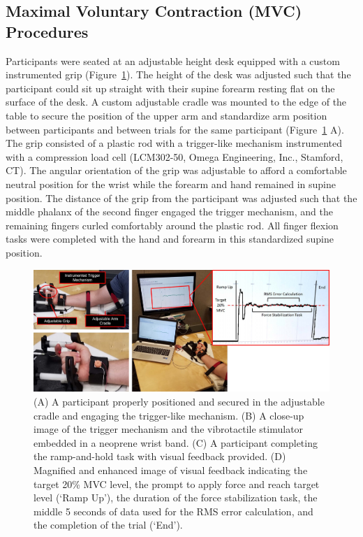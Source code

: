 \documentclass[]{cik}%
\begin{document}
\hypertarget{maximal-voluntary-contraction-mvc-procedures}{%
\subsection{Maximal Voluntary Contraction (MVC)
Procedures}\label{maximal-voluntary-contraction-mvc-procedures}}

Participants were seated at an adjustable height desk equipped with a
custom instrumented grip (Figure~\ref{fig-1}). The height of the desk
was adjusted such that the participant could sit up straight with their
supine forearm resting flat on the surface of the desk. A custom
adjustable cradle was mounted to the edge of the table to secure the
position of the upper arm and standardize arm position between
participants and between trials for the same participant
(Figure~\ref{fig-1} A). The grip consisted of a plastic rod with a
trigger-like mechanism instrumented with a compression load cell
(LCM302-50, Omega Engineering, Inc., Stamford, CT). The angular
orientation of the grip was adjustable to afford a comfortable neutral
position for the wrist while the forearm and hand remained in supine
position. The distance of the grip from the participant was adjusted
such that the middle phalanx of the second finger engaged the trigger
mechanism, and the remaining fingers curled comfortably around the
plastic rod. All finger flexion tasks were completed with the hand and
forearm in this standardized supine position.

\begin{figure}

{\centering \includegraphics[width=1\textwidth,height=\textheight]{./figures/fig1.pdf}

}

\caption{\label{fig-1}(A) A participant properly positioned and secured
in the adjustable cradle and engaging the trigger-like mechanism. (B) A
close-up image of the trigger mechanism and the vibrotactile stimulator
embedded in a neoprene wrist band. (C) A participant completing the
ramp-and-hold task with visual feedback provided. (D) Magnified and
enhanced image of visual feedback indicating the target 20\% MVC level,
the prompt to apply force and reach target level (`Ramp Up'), the
duration of the force stabilization task, the middle 5 seconds of data
used for the RMS error calculation, and the completion of the trial
(`End').}

\end{figure}
\end{document}
